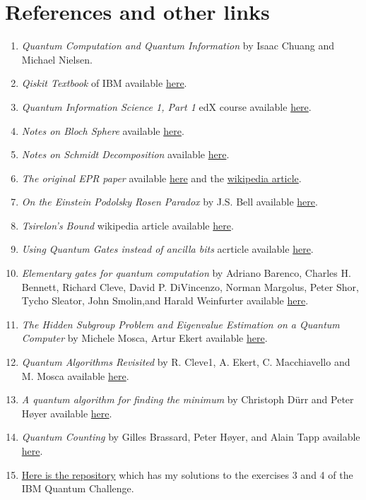 \documentclass{report}
\begin{document}
\chapter*{References and other links}
\begin{enumerate}
    \item \textit{Quantum Computation and Quantum Information} by Isaac Chuang and Michael Nielsen.
    \item \textit{Qiskit Textbook} of IBM available \href{https://qiskit.org/textbook/preface.html}{here}.
    \item \textit{Quantum Information Science 1, Part 1} edX course available \href{https://courses.edx.org/courses/course-v1:MITx+8.370.1x+1T2018/course/}{here}.
    \item \textit{Notes on Bloch Sphere} available \href{http://web.cecs.pdx.edu/~mperkows/june2007/bloch-sphere.pdf}{here}.
    \item \textit{Notes on Schmidt Decomposition} available  \href{http://users.ox.ac.uk/~kch/demos/quantc7/fqt07w7.pdf}{here}.
    \item \textit{The original EPR paper} available \href{https://journals.aps.org/pr/pdf/10.1103/PhysRev.47.777}{here} and the \href{https://en.wikipedia.org/wiki/EPR_paradox}{wikipedia article}.
    \item \textit{On the Einstein Podolsky Rosen Paradox} by J.S. Bell available \href{https://cds.cern.ch/record/111654/files/vol1p195-200_001.pdf}{here}.
    \item \textit{Tsirelon's Bound} wikipedia article available \href{https://en.wikipedia.org/wiki/Tsirelson\%27s_bound}{here}.
    \item \textit{Using Quantum Gates instead of ancilla bits} acrticle available  \href{https://algassert.com/circuits/2015/06/22/Using-Quantum-Gates-instead-of-Ancilla-Bits.html}{here}.
    \item \textit{Elementary gates for quantum computation} by Adriano Barenco, Charles H. Bennett, Richard Cleve, David P. DiVincenzo, Norman Margolus, Peter Shor, Tycho Sleator, John Smolin,and Harald Weinfurter available \href{https://arxiv.org/pdf/quant-ph/9503016.pdf}{here}.
    \item \textit{The Hidden Subgroup Problem and Eigenvalue Estimation on a Quantum Computer} by Michele Mosca, Artur Ekert available \href{https://arxiv.org/pdf/quant-ph/9903071.pdf}{here}.
    \item \textit{Quantum Algorithms Revisited} by R. Cleve1, A. Ekert, C. Macchiavello and M. Mosca available \href{https://arxiv.org/pdf/quant-ph/9708016.pdf}{here}.
    \item \textit{A quantum algorithm for finding the minimum} by Christoph D\"{u}rr and Peter Høyer available \href{https://arxiv.org/pdf/quant-ph/9607014.pdf}{here}.
    \item \textit{Quantum Counting} by Gilles Brassard, Peter Høyer, and Alain Tapp available \href{https://arxiv.org/pdf/quant-ph/9805082.pdf}{here}.
    \item \href{https://github.com/mahadevans2432/IBM-Quantum-Challenge}{Here is the repository} which has my solutions to the exercises 3 and 4 of the IBM Quantum Challenge.
\end{enumerate}
\end{document}
